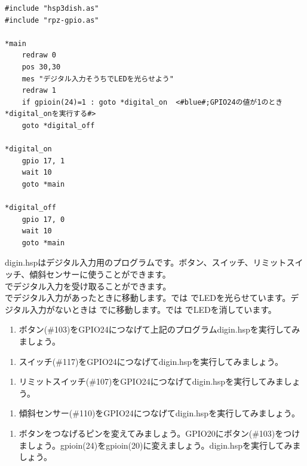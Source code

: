 \begin{lstlisting}[caption=digout.hsp,label=digout.hsp]
#include "hsp3dish.as"
#include "rpz-gpio.as"

*main
	redraw 0
	pos 30,30
	mes "デジタル入力そうちでLEDを光らせよう"
	redraw 1
	if gpioin(24)=1 : goto *digital_on	<#blue#;GPIO24の値が1のとき*digital_onを実行する#>
	goto *digital_off
        
*digital_on
	gpio 17, 1
	wait 10
	goto *main

*digital_off
	gpio 17, 0
	wait 10
	goto *main
\end{lstlisting}

digin.hspはデジタル入力用のプログラムです。ボタン、スイッチ、リミットスイッチ、傾斜センサーに使うことができます。\\

でデジタル入力を受け取ることができます。\\

でデジタル入力があったときに移動します。では でLEDを光らせています。デジタル入力がないときは でに移動します。では でLEDを消しています。

\begin{tcolorbox}[title=\useOmetoi]
\begin{enumerate}
\item ボタン(\#103)をGPIO24につなげて上記のプログラムdigin.hspを実行してみましょう。
\end{enumerate}
\end{tcolorbox}
\begin{tcolorbox}[title=\useOmetoi]
\begin{enumerate}
\item スイッチ(\#117)をGPIO24につなげてdigin.hspを実行してみましょう。
\end{enumerate}
\end{tcolorbox}
\begin{tcolorbox}[title=\useOmetoi]
\begin{enumerate}
\item リミットスイッチ(\#107)をGPIO24につなげてdigin.hspを実行してみましょう。
\end{enumerate}
\end{tcolorbox}
\begin{tcolorbox}[title=\useOmetoi]
\begin{enumerate}
\item 傾斜センサー(\#110)をGPIO24につなげてdigin.hspを実行してみましょう。
\end{enumerate}
\end{tcolorbox}
\begin{tcolorbox}[title=\useOmetoi]
\begin{enumerate}
\item ボタンをつなげるピンを変えてみましょう。GPIO20にボタン(\#103)をつけましょう。gpioin(24)をgpioin(20)に変えましょう。digin.hspを実行してみましょう。
\end{enumerate}
\end{tcolorbox}

